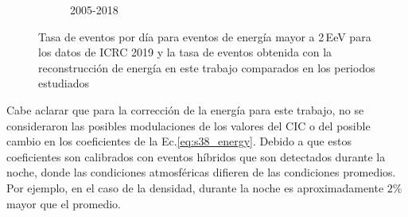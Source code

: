 \begin{figure}[H]
\begin{subfigure}[b]{0.5\textwidth}
                \caption{2005-2018}\label{fig:2EeV_expected_05_18}
                \end{subfigure}%
                \caption{Tasa de eventos por día para eventos de energía mayor a 2\,EeV para los datos de ICRC 2019 y la tasa de eventos obtenida con la reconstrucción de energía en este trabajo comparados en los periodos estudiados}\label{final}
        \end{figure}
Cabe aclarar que para la corrección de la energía para este trabajo, no se consideraron las posibles modulaciones de los valores del CIC o del posible cambio en los coeficientes de la Ec.\ref{eq:s38_energy}. Debido a que estos coeficientes son calibrados con eventos híbridos que son detectados durante la noche, donde las condiciones atmosféricas difieren de las condiciones promedios. Por ejemplo, en el caso de la densidad, durante la noche es aproximadamente $2\%$ mayor que el promedio.

